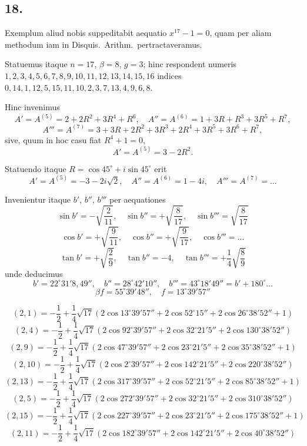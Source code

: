 \documentclass[12pt,a4paper]{article}
\begin{document}
\subsection*{18.}

Exemplum aliud nobis suppeditabit aequatio $x^{17}-1=0$, quam per aliam methodum iam in Disquis.\ Arithm.\ pertractaveramus.

Statuemus itaque $n=17$, $\beta=8$, $g=3$; hinc respondent numeris $1, 2, 3, 4, 5, 6, 7, 8, 9, 10, 11, 12, 13, 14, 15, 16$ indices $0, 14, 1, 12, 5, 15, 11, 10, 2, 3, 7, 13, 4, 9, 6, 8$.

Hinc invenimus
\[
A' = A^{(5)} = 2 + 2R^2 + 3R^4 + R^6, \quad A'' = A^{(6)} = 1 + 3R + R^3 + 3R^5 + R^7,
\]
\[
A''' = A^{(7)} = 3 + 3R + 2R^2 + 3R^3 + 2R^4 + 3R^5 + 3R^6 + R^7,
\]
sive, quum in hoc casu fiat $R^4 + 1 = 0$,
\[
A' = A^{(5)} = 3 - 2R^2.
\]

Statuendo itaque $R = \cos 45^\circ + i\sin 45^\circ$ erit
\[
A' = A^{(5)} = -3 - 2i\sqrt{2}, \quad A'' = A^{(6)} = 1 - 4i, \quad A''' = A^{(7)} = \ldots
\]

Invenientur itaque $b'$, $b''$, $b'''$ per aequationes
\[
\sin b' = -\sqrt{\frac{2}{11}}, \quad \sin b'' = +\sqrt{\frac{8}{17}}, \quad \sin b''' = \sqrt{\frac{8}{17}}
\]
\[
\cos b' = +\sqrt{\frac{9}{11}}, \quad \cos b'' = +\sqrt{\frac{9}{17}}, \quad \cos b''' = \ldots
\]
\[
\tan b' = +\sqrt{\frac{2}{9}}, \quad \tan b'' = -4, \quad \tan b''' = +\frac{1}{4}\sqrt{\frac{8}{9}}
\]
unde deducimus
\[
b' = 22^\circ 31' 8{,}49'', \quad b'' = 28^\circ 42' 10'', \quad b''' = 43^\circ 18' 49'' = b' + 180^\circ \ldots
\]
\[
\beta f = 55^\circ 39' 48'', \quad f = 13^\circ 39' 57''
\]

\[
(2,1) = -\frac{1}{2} + \frac{1}{4}\sqrt{17}\left(2\cos 13^\circ 39' 57'' + 2\cos 52^\circ 15'' + 2\cos 26^\circ 38' 52'' + 1\right)
\]
\[
(2,4) = -\frac{1}{2} + \frac{1}{4}\sqrt{17}\left(2\cos 92^\circ 39' 57'' + 2\cos 32^\circ 21' 5'' + 2\cos 130^\circ 38' 52''\right)
\]
\[
(2,9) = -\frac{1}{2} + \frac{1}{4}\sqrt{17}\left(2\cos 47^\circ 39' 57'' + 2\cos 23^\circ 21' 5'' + 2\cos 35^\circ 38' 52'' + 1\right)
\]
\[
(2,10) = -\frac{1}{2} + \frac{1}{4}\sqrt{17}\left(2\cos 2^\circ 39' 57'' + 2\cos 142^\circ 21' 5'' + 2\cos 220^\circ 38' 52''\right)
\]
\[
(2,13) = -\frac{1}{2} + \frac{1}{4}\sqrt{17}\left(2\cos 317^\circ 39' 57'' + 2\cos 52^\circ 21' 5'' + 2\cos 85^\circ 38' 52'' + 1\right)
\]
\[
(2,5) = -\frac{1}{2} + \frac{1}{4}\sqrt{17}\left(2\cos 272^\circ 39' 57'' + 2\cos 32^\circ 21' 5'' + 2\cos 310^\circ 38' 52''\right)
\]
\[
(2,15) = -\frac{1}{2} + \frac{1}{4}\sqrt{17}\left(2\cos 227^\circ 39' 57'' + 2\cos 23^\circ 21' 5'' + 2\cos 175^\circ 38' 52'' + 1\right)
\]
\[
(2,11) = -\frac{1}{2} + \frac{1}{4}\sqrt{17}\left(2\cos 182^\circ 39' 57'' + 2\cos 142^\circ 21' 5'' + 2\cos 40^\circ 38' 52''\right)
\]
\end{document}

